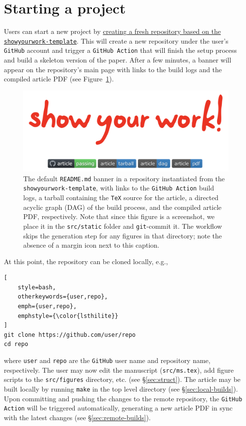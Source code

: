 \documentclass[twocolumn]{aastex631}
\begin{document}
\section{Starting a project}
\label{sec:start}
%
Users can start a new project by \href{https://github.com/rodluger/showyourwork-template/generate}{creating a fresh repository based on the \texttt{showyourwork-template}}.
This will create a new repository under the user's \texttt{GitHub} account and trigger a \texttt{GitHub Action} that will finish the setup process and build a skeleton version of the paper.
After a few minutes, a banner will appear on the repository's main page with links to the build logs and the compiled article PDF (see Figure~\ref{fig:banner}).
%
\begin{figure}[th!]
    \begin{centering}
        \includegraphics[width=\linewidth]{static/banner.png}
        \caption{
            The default \texttt{README.md} banner in a repository instantiated from the \texttt{showyourwork-template}, with links to the \texttt{GitHub Action} build logs, a tarball containing the \texttt{TeX} source for the article, a directed acyclic graph (DAG) of the build process, and the compiled article PDF, respectively.
            Note that since this figure is a screenshot, we place it in the \texttt{src/static} folder and \texttt{git}-commit it.
            The workflow skips the generation step for any figures in that directory; note the absence of a margin icon next to this caption.
        }
        \label{fig:banner}
    \end{centering}
\end{figure}
%
At this point, the repository can be cloned locally, e.g.,
%
\begin{lstlisting}[
    style=bash,
    otherkeywords={user,repo},
    emph={user,repo},
    emphstyle={\color{lsthilite}}
]
git clone https://github.com/user/repo
cd repo
\end{lstlisting}
%
where {\color{lsthilite}\texttt{user}} and {\color{lsthilite}\texttt{repo}} are the \texttt{GitHub} user name and repository name, respectively.
The user may now edit the manuscript (\texttt{src/ms.tex}), add figure scripts to the \texttt{src/figures} directory, etc. (see \S\ref{sec:struct}).
The article may be built locally by running \texttt{make} in the top level directory (see \S\ref{sec:local-builds}).
Upon committing and pushing the changes to the remote repository, the \texttt{GitHub Action} will be triggered automatically, generating a new article PDF in sync with the latest changes (see \S\ref{sec:remote-builds}).
\end{document}
